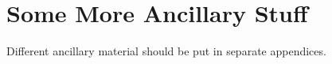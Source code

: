 
\chapter{Some More Ancillary Stuff}

Different ancillary material should be put in separate appendices.
